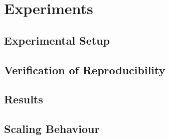 \chapter{Experiments}
\label{ch:Experiments}

\section{Experimental Setup}
\label{sec:ExperimentalSetup}

\section{Verification of Reproducibility}
\label{sec:VerificationOfReproducibility}

\section{Results}
\label{sec:Results}

\section{Scaling Behaviour}
\label{sec:ScalingBehaviour}